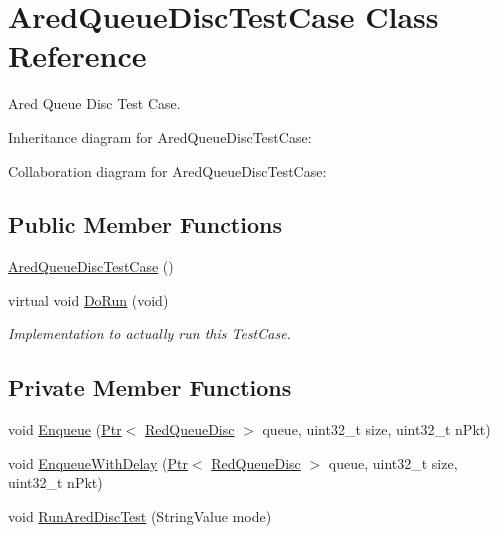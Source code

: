 \hypertarget{classAredQueueDiscTestCase}{}\section{Ared\+Queue\+Disc\+Test\+Case Class Reference}
\label{classAredQueueDiscTestCase}


Ared Queue Disc Test Case.  




Inheritance diagram for Ared\+Queue\+Disc\+Test\+Case\+:


Collaboration diagram for Ared\+Queue\+Disc\+Test\+Case\+:
\subsection*{Public Member Functions}
\begin{DoxyCompactItemize}
\item 
\hyperlink{classAredQueueDiscTestCase_a9a16cb252527880b1a70287c4d098f8e}{Ared\+Queue\+Disc\+Test\+Case} ()
\item 
virtual void \hyperlink{classAredQueueDiscTestCase_a195e997827d606a561c71b81aeecdcf3}{Do\+Run} (void)
\begin{DoxyCompactList}\small\item\em Implementation to actually run this Test\+Case. \end{DoxyCompactList}\end{DoxyCompactItemize}
\subsection*{Private Member Functions}
\begin{DoxyCompactItemize}
\item 
void \hyperlink{classAredQueueDiscTestCase_a5528c44233e1056913e76d5be988f049}{Enqueue} (\hyperlink{classns3_1_1Ptr}{Ptr}$<$ \hyperlink{classns3_1_1RedQueueDisc}{Red\+Queue\+Disc} $>$ queue, uint32\+\_\+t size, uint32\+\_\+t n\+Pkt)
\item 
void \hyperlink{classAredQueueDiscTestCase_a79ce3b6eab6abac51c635056d58b6d8b}{Enqueue\+With\+Delay} (\hyperlink{classns3_1_1Ptr}{Ptr}$<$ \hyperlink{classns3_1_1RedQueueDisc}{Red\+Queue\+Disc} $>$ queue, uint32\+\_\+t size, uint32\+\_\+t n\+Pkt)
\item 
void \hyperlink{classAredQueueDiscTestCase_af33ca2897664beffd21b068804c9cb2b}{Run\+Ared\+Disc\+Test} (String\+Value mode)
\end{DoxyCompactItemize}
